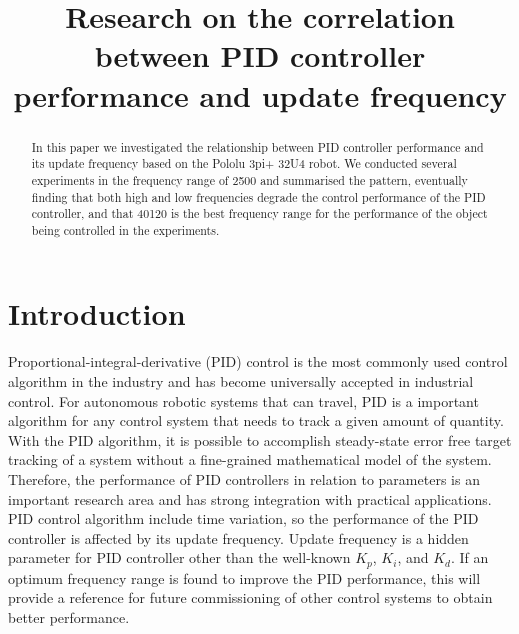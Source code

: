 \documentclass[conference]{IEEEtran}
\begin{document}
\title{Research on the correlation between PID controller performance and update frequency}

\author{
    \and
}

\maketitle

\begin{abstract}
In this paper we investigated the relationship between PID controller performance and its update frequency based on the Pololu 3pi+ 32U4 robot. We conducted several experiments in the frequency range of 2\bm{$\sim$}500 and summarised the pattern, eventually finding that both high and low frequencies degrade the control performance of the PID controller, and that 40\bm{$\sim$}120 is the best frequency range for the performance of the object being controlled in the experiments.
\end{abstract}


\section{Introduction}
\label{Introduction}
Proportional-integral-derivative (PID) control is the most commonly used control algorithm in the industry and has become universally accepted in industrial control\cite{knospe2006pid}. For autonomous robotic systems that can travel, 
PID is a important algorithm for any control system that needs to track a given amount of quantity. With the PID algorithm, it is possible to accomplish steady-state error free target tracking of a system without a fine-grained mathematical model of the system. Therefore, the performance of PID controllers in relation to parameters is an important research area and has strong integration with practical applications.
PID control algorithm include time variation, so the performance of the PID controller is affected by its update frequency. Update frequency is a hidden parameter for PID controller other than the well-known $K_{p}$, $K_{i}$, and $K_{d}$. 
 If an optimum frequency range is found to improve the PID performance, this will provide a reference for future commissioning of other control systems to obtain better performance.
\end{document}
